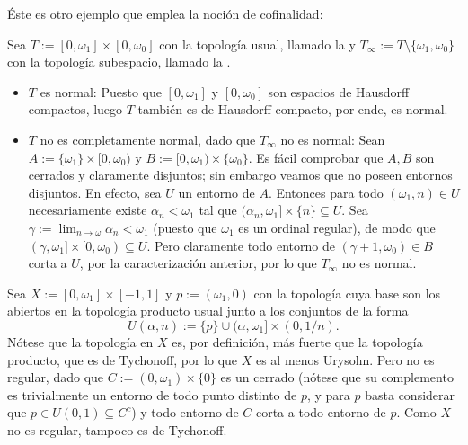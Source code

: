 \documentclass[topologia-analisis.tex]{subfiles}
\begin{document}
Éste es otro ejemplo que emplea la noción de cofinalidad:
\begin{exn}\label{ex:tychonoff_plank}
	Sea $T := [0, \omega_1] \times [0, \omega_0]$ con la topología usual, llamado la 
	y $T_\infty := T \setminus \{\omega_1, \omega_0\}$ con la topología subespacio, llamado la .
	\begin{itemize}
		\item $T$ es normal:
			Puesto que $[0, \omega_1]$ y $[0, \omega_0]$ son espacios de Hausdorff compactos,
			luego $T$ también es de Hausdorff compacto, por ende, es normal.

		\item $T$ no es completamente normal, dado que $T_\infty$ no es normal:
			Sean $A := \{\omega_1\} \times [0, \omega_0)$ y $B := [0, \omega_1) \times \{\omega_0\}$.
			Es fácil comprobar que $A, B$ son cerrados y claramente disjuntos; sin embargo veamos que no poseen entornos disjuntos.
			En efecto, sea $U$ un entorno de $A$.
			Entonces para todo $(\omega_1, n) \in U$ necesariamente existe $\alpha_n < \omega_1$ tal que
			$(\alpha_n, \omega_1] \times \{n\} \subseteq U$.
			Sea $\gamma := \lim_{n\to\omega} \alpha_n < \omega_1$ (puesto que $\omega_1$ es un ordinal regular),
			de modo que $(\gamma, \omega_1] \times [0, \omega_0) \subseteq U$.
			Pero claramente todo entorno de $(\gamma + 1, \omega_0) \in B$ corta a $U$, por la caracterización anterior,
			por lo que $T_\infty$ no es normal.
	\end{itemize}
\end{exn}

\begin{exn}\label{ex:alexandroff_plank}
	Sea $X := [0, \omega_1] \times [-1, 1]$ y $p := (\omega_1, 0)$ con la topología cuya base son los abiertos en la topología producto usual
	junto a los conjuntos de la forma
	$$ U(\alpha, n) := \{p\} \cup (\alpha, \omega_1]\times(0, 1/n). $$
	Nótese que la topología en $X$ es, por definición, más fuerte que la topología producto, que es de Tychonoff, por lo que $X$ es al menos Urysohn.
	Pero no es regular, dado que $C := (0, \omega_1) \times \{0\}$ es un cerrado (nótese que su complemento es trivialmente un entorno de todo punto
	distinto de $p$, y para $p$ basta considerar que $p \in U(0, 1) \subseteq C^c$) y todo entorno de $C$ corta a todo entorno de $p$.
	Como $X$ no es regular, tampoco es de Tychonoff.
\end{exn}
\end{document}
